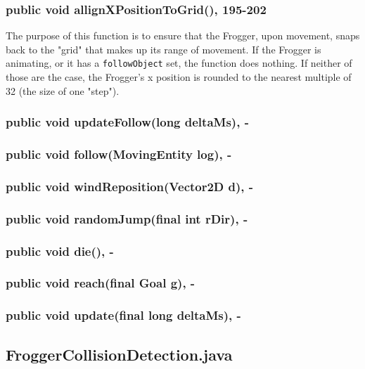 \documentclass[12pt]{article}
\begin{document}
\subsubsection{public void allignXPositionToGrid(), 195-202}
The purpose of this function is to ensure that the Frogger, upon movement, snaps back to the "grid" that makes up its range of movement.
If the Frogger is animating, or it has a \verb|followObject| set, the function does nothing.
If neither of those are the case, the Frogger's x position is rounded to the nearest multiple of 32 (the size of one "step").

\subsubsection{public void updateFollow(long deltaMs), -}

\subsubsection{public void follow(MovingEntity log), -}

\subsubsection{public void windReposition(Vector2D d), -}

\subsubsection{public void randomJump(final int rDir), -}

\subsubsection{public void die(), -}

\subsubsection{public void reach(final Goal g), -}

\subsubsection{public void update(final long deltaMs), -}


\subsection{FroggerCollisionDetection.java}
\end{document}
